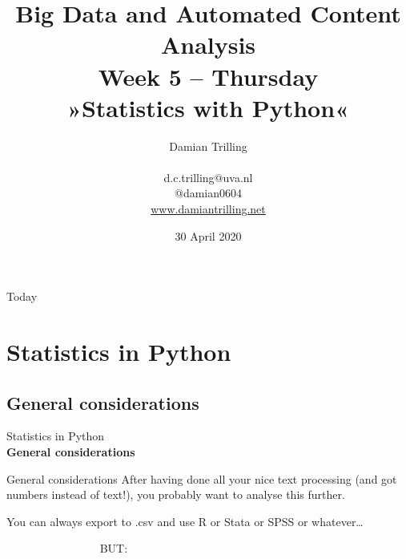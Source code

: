 \documentclass{beamer}
\begin{document}
\title[Big Data and Automated Content Analysis]{\textbf{Big Data and Automated Content Analysis} \\ Week 5 -- Thursday \\ »Statistics with Python«}
\author[Damian Trilling]{Damian Trilling \\ ~ \\ \footnotesize{d.c.trilling@uva.nl \\@damian0604} \\ \url{www.damiantrilling.net}}
\date{30 April 2020}

\begin{frame}
\titlepage
\end{frame}

\begin{frame}{Today}
\tableofcontents
\end{frame}



\section{Statistics in Python}
\subsection{General considerations}

\begin{frame}[plain]
Statistics in Python\\
\textbf{General considerations}
\end{frame}

\begin{frame}{General considerations}
After having done all your nice text processing (and got numbers instead of text!), you probably want to analyse this further.

You can always export to .csv and use R or Stata or SPSS or whatever\ldots

\vspace{1cm}
\pause

~~~~~~~~~~~~~~~~ \Huge{BUT:}
\end{frame}
\end{document}
